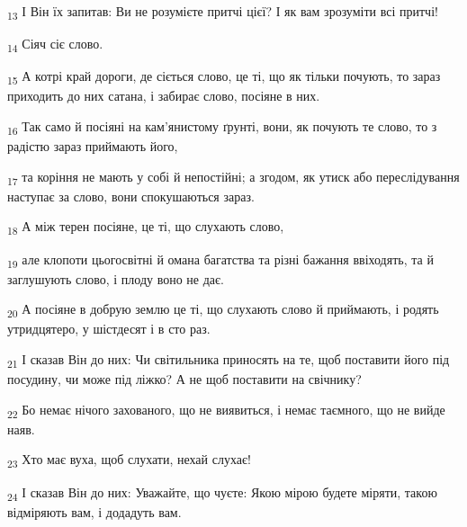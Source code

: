 \begin{tcolorbox}
\textsubscript{13} І Він їх запитав: Ви не розумієте притчі цієї? І як вам зрозуміти всі притчі!
\end{tcolorbox}
\begin{tcolorbox}
\textsubscript{14} Сіяч сіє слово.
\end{tcolorbox}
\begin{tcolorbox}
\textsubscript{15} А котрі край дороги, де сіється слово, це ті, що як тільки почують, то зараз приходить до них сатана, і забирає слово, посіяне в них.
\end{tcolorbox}
\begin{tcolorbox}
\textsubscript{16} Так само й посіяні на кам'янистому ґрунті, вони, як почують те слово, то з радістю зараз приймають його,
\end{tcolorbox}
\begin{tcolorbox}
\textsubscript{17} та коріння не мають у собі й непостійні; а згодом, як утиск або переслідування наступає за слово, вони спокушаються зараз.
\end{tcolorbox}
\begin{tcolorbox}
\textsubscript{18} А між терен посіяне, це ті, що слухають слово,
\end{tcolorbox}
\begin{tcolorbox}
\textsubscript{19} але клопоти цьогосвітні й омана багатства та різні бажання ввіходять, та й заглушують слово, і плоду воно не дає.
\end{tcolorbox}
\begin{tcolorbox}
\textsubscript{20} А посіяне в добрую землю це ті, що слухають слово й приймають, і родять утридцятеро, у шістдесят і в сто раз.
\end{tcolorbox}
\begin{tcolorbox}
\textsubscript{21} І сказав Він до них: Чи світильника приносять на те, щоб поставити його під посудину, чи може під ліжко? А не щоб поставити на свічнику?
\end{tcolorbox}
\begin{tcolorbox}
\textsubscript{22} Бо немає нічого захованого, що не виявиться, і немає таємного, що не вийде наяв.
\end{tcolorbox}
\begin{tcolorbox}
\textsubscript{23} Хто має вуха, щоб слухати, нехай слухає!
\end{tcolorbox}
\begin{tcolorbox}
\textsubscript{24} І сказав Він до них: Уважайте, що чуєте: Якою мірою будете міряти, такою відміряють вам, і додадуть вам.
\end{tcolorbox}
